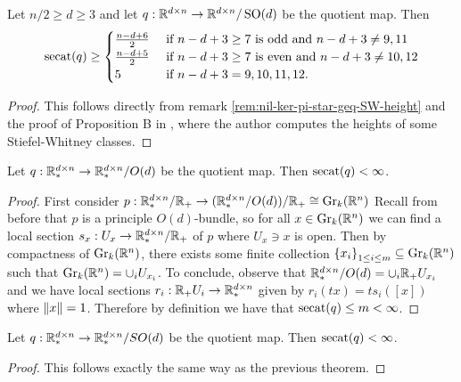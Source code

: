 \begin{theorem}
    Let $n/2 \geq d \geq 3$ and let $q : \mathbb{R}^{d \times n} \to \mathbb{R}^{d \times n}/\operatorname{SO}(d)$ be the quotient map.
    Then
    \[
        \operatorname{secat}(q)
        \geq \begin{cases}
            \frac{n - d + 6}{2} &\text{ if } n - d + 3 \geq 7 \text{ is odd} \text{ and } n - d + 3 \neq 9,11 \\
            \frac{n - d + 5}{2} &\text{ if } n - d + 3 \geq 7 \text{ is even} \text{ and } n - d + 3 \neq 10,12 \\
            5 &\text{ if } n - d + 3 = 9,10,11,12.
        \end{cases}
    \]
    \begin{proof}
        This follows directly from remark \ref{rem:nil-ker-pi-star-geq-SW-height} and the proof of Proposition B in \cite{korbas2006cuplengthbounds}, where the author computes the heights of some Stiefel-Whitney classes.
    \end{proof}
\end{theorem}

\begin{theorem}
    Let $q : \mathbb{R}^{d \times n}_* \to \mathbb{R}^{d \times n}_* / O(d)$ be the quotient map.
    Then $\operatorname{secat}(q) < \infty$.
    \begin{proof}
        First consider $p : \mathbb{R}^{d \times n}_*/\mathbb{R}_+ \to (\mathbb{R}^{d \times n}_*/O(d))/\mathbb{R}_+ \cong \operatorname{Gr}_k(\mathbb{R}^n)$
        Recall from before that $p$ is a principle $O(d)$-bundle, so for all $x \in \operatorname{Gr}_k(\mathbb{R}^n)$ we can find a local section $s_x : U_x \to \mathbb{R}^{d \times n}_*/\mathbb{R}_+$ of $p$ where $U_x \ni x$ is open.
        Then by compactness of $\operatorname{Gr}_k(\mathbb{R}^n)$, there exists some finite collection $\left\{ x_i \right\}_{1 \leq i \leq m} \subseteq \operatorname{Gr}_k(\mathbb{R}^n)$ such that $\operatorname{Gr}_k(\mathbb{R}^n) = \cup_i U_{x_i}$.
        To conclude, observe that $\mathbb{R}^{d \times n}_*/O(d) = \cup_{i} \mathbb{R}_+ U_{x_i}$ and we have local sections $r_i : \mathbb{R}_+ U_i \to \mathbb{R}^{d \times n}_*$  given by $r_i(tx) = ts_i([x])$ where $\left\| x \right\| = 1$.
        Therefore by definition we have that $\operatorname{secat}(q) \leq m < \infty$.
    \end{proof}
\end{theorem}

\begin{theorem}
    Let $q : \mathbb{R}^{d \times n}_* \to \mathbb{R}^{d \times n}_* / SO(d)$ be the quotient map.
    Then $\operatorname{secat}(q) < \infty$.
    \begin{proof}
        This follows exactly the same way as the previous theorem.
    \end{proof}
\end{theorem}


